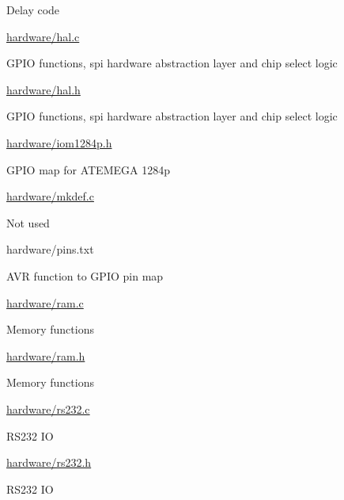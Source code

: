 \begin{DoxyPre}
\begin{DoxyItemize}
\begin{DoxyItemize}
\begin{DoxyItemize}
\item Delay code
\end{DoxyItemize}
\item \hyperlink{hal_8c}{hardware/hal.c}
\begin{DoxyItemize}
\item GPIO functions, spi hardware abstraction layer and chip select logic
\end{DoxyItemize}
\item \hyperlink{hal_8h}{hardware/hal.h}
\begin{DoxyItemize}
\item GPIO functions, spi hardware abstraction layer and chip select logic
\end{DoxyItemize}
\item \hyperlink{iom1284p_8h}{hardware/iom1284p.h}
\begin{DoxyItemize}
\item GPIO map for ATEMEGA 1284p
\end{DoxyItemize}
\item \hyperlink{mkdef_8c}{hardware/mkdef.c}
\begin{DoxyItemize}
\item Not used
\end{DoxyItemize}
\item hardware/pins.txt
\begin{DoxyItemize}
\item AVR function to GPIO pin map
\end{DoxyItemize}
\item \hyperlink{ram_8c}{hardware/ram.c}
\begin{DoxyItemize}
\item Memory functions
\end{DoxyItemize}
\item \hyperlink{ram_8h}{hardware/ram.h}
\begin{DoxyItemize}
\item Memory functions
\end{DoxyItemize}
\item \hyperlink{rs232_8c}{hardware/rs232.c}
\begin{DoxyItemize}
\item RS232 IO
\end{DoxyItemize}
\item \hyperlink{rs232_8h}{hardware/rs232.h}
\begin{DoxyItemize}
\item RS232 IO
\end{DoxyItemize}

\end{DoxyItemize}
\end{DoxyItemize}
\end{DoxyPre}
